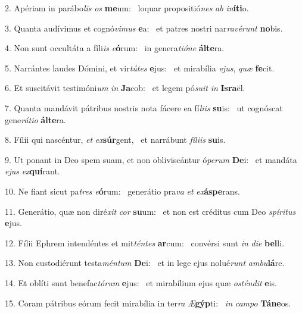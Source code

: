 2. Apériam in parábo\textit{lis} \textit{os} \textbf{me}um: \ast\  loquar propositió\textit{nes} \textit{ab} \textit{in}\textbf{í}\textbf{ti}o.\

3. Quanta audívimus et cognó\textit{vi}\textit{mus} \textbf{e}a: \ast\  et patres nostri nar\textit{ra}\textit{vé}\textit{runt} \textbf{no}bis.\

4. Non sunt occultáta a fíli\textit{is} \textit{e}\textbf{ó}rum: \ast\  in genera\textit{ti}\textit{ó}\textit{ne} \textbf{ál}\textbf{te}ra.\

5. Narrántes laudes Dómini, et vir\textit{tú}\textit{tes} \textbf{e}jus: \ast\  et mirabília \textit{e}\textit{jus}, \textit{quæ} \textbf{fe}cit.\

6. Et suscitávit testimóni\textit{um} \textit{in} \textbf{Ja}cob: \ast\  et legem pó\textit{su}\textit{it} \textit{in} \textbf{Is}\textbf{ra}ël.\

7. Quanta mandávit pátribus nostris nota fácere ea fí\textit{li}\textit{is} \textbf{su}is: \ast\  ut cognóscat gene\textit{rá}\textit{ti}\textit{o} \textbf{ál}\textbf{te}ra.\

8. Fílii qui nascéntur, \textit{et} \textit{ex}\textbf{súr}gent, \ast\  et narrábunt \textit{fí}\textit{li}\textit{is} \textbf{su}is.\

9. Ut ponant in Deo spem suam, et non obliviscántur ó\textit{pe}\textit{rum} \textbf{De}i: \ast\  et mandáta \textit{e}\textit{jus} \textit{ex}\textbf{quí}rant.\

10. Ne fiant sicut pa\textit{tres} \textit{e}\textbf{ó}rum: \ast\  generátio pra\textit{va} \textit{et} \textit{ex}\textbf{ás}\textbf{pe}rans.\

11. Generátio, quæ non diré\textit{xit} \textit{cor} \textbf{su}um: \ast\  et non est créditus cum Deo \textit{spí}\textit{ri}\textit{tus} \textbf{e}jus.\

12. Fílii Ephrem intendéntes et mit\textit{tén}\textit{tes} \textbf{ar}cum: \ast\  convérsi sunt \textit{in} \textit{di}\textit{e} \textbf{bel}li.\

13. Non custodiérunt testa\textit{mén}\textit{tum} \textbf{De}i: \ast\  et in lege ejus nolué\textit{runt} \textit{am}\textit{bu}\textbf{lá}re.\

14. Et oblíti sunt benefac\textit{tó}\textit{rum} \textbf{e}jus: \ast\  et mirabílium ejus quæ \textit{os}\textit{tén}\textit{dit} \textbf{e}is.\

15. Coram pátribus eórum fecit mirabília in ter\textit{ra} \textit{Æ}\textbf{gýp}ti: \ast\  \textit{in} \textit{cam}\textit{po} \textbf{Tá}\textbf{ne}os.\

